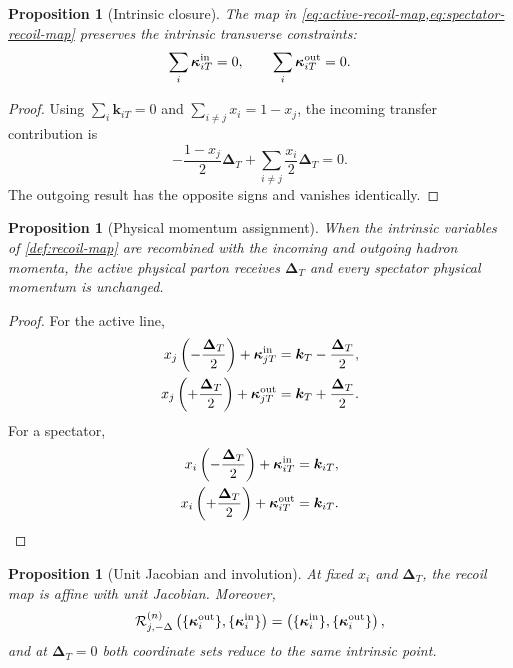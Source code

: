 \documentclass[11pt]{article}
\newtheorem{proposition}[definition]{Proposition}
\newcommand{\kT}{\bm{k}_{T}}
\newcommand{\kiT}{\bm{k}_{iT}}
\newcommand{\DT}{\bm{\Delta}_{T}}
\newcommand{\cR}{\mathcal R}
\begin{document}
\begin{proposition}[Intrinsic closure]
\label{prop:intrinsic-closure}
The map in \cref{eq:active-recoil-map,eq:spectator-recoil-map} preserves the
intrinsic transverse constraints:
\begin{equation}
 \sum_i\bm\kappa_{iT}^{\rm in}=0,
 \qquad
 \sum_i\bm\kappa_{iT}^{\rm out}=0.
\label{eq:recoil-closure}
\end{equation}
\end{proposition}

\begin{proof}
Using \(\sum_i\kiT=0\) and
\(\sum_{i\ne j}x_i=1-x_j\), the incoming transfer contribution is
\begin{equation}
 -\frac{1-x_j}{2}\DT
 +\sum_{i\ne j}\frac{x_i}{2}\DT=0.
\end{equation}
The outgoing result has the opposite signs and vanishes identically.
\end{proof}

\begin{proposition}[Physical momentum assignment]
\label{prop:physical-assignment}
When the intrinsic variables of \cref{def:recoil-map} are recombined with the
incoming and outgoing hadron momenta, the active physical parton receives
\(\DT\) and every spectator physical momentum is unchanged.
\end{proposition}

\begin{proof}
For the active line,
\begin{align}
 x_j\left(-\frac{\DT}{2}\right)
 +\bm\kappa_{jT}^{\rm in}
 &=\kT-\frac{\DT}{2},\\
 x_j\left(+\frac{\DT}{2}\right)
 +\bm\kappa_{jT}^{\rm out}
 &=\kT+\frac{\DT}{2}.
\end{align}
For a spectator,
\begin{align}
 x_i\left(-\frac{\DT}{2}\right)
 +\bm\kappa_{iT}^{\rm in}&=\kiT,\\
 x_i\left(+\frac{\DT}{2}\right)
 +\bm\kappa_{iT}^{\rm out}&=\kiT.
\end{align}
\end{proof}

\begin{proposition}[Unit Jacobian and involution]
\label{prop:recoil-jacobian}
At fixed \(x_i\) and \(\DT\), the recoil map is affine with unit Jacobian.
Moreover,
\begin{equation}
 \cR_{j,-\Delta}^{(n)}
 \left(\{\bm\kappa_i^{\rm out}\},
       \{\bm\kappa_i^{\rm in}\}\right)
 =
 \left(\{\bm\kappa_i^{\rm in}\},
       \{\bm\kappa_i^{\rm out}\}\right),
\label{eq:recoil-involution}
\end{equation}
and at \(\DT=0\) both coordinate sets reduce to the same intrinsic point.
\end{proposition}
\end{document}
